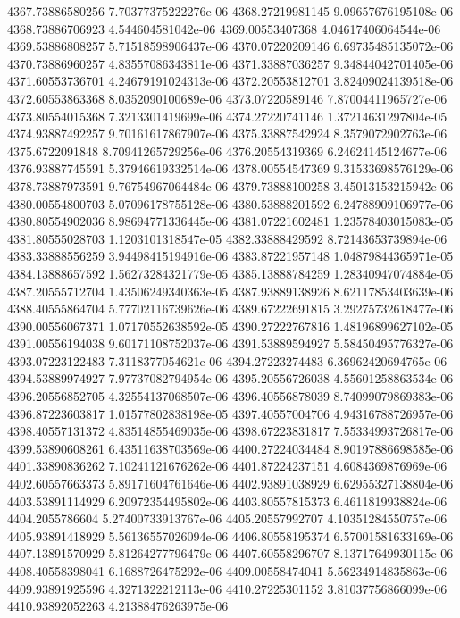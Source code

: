 {4367.73886580256 7.70377375222276e-06
4368.27219981145 9.09657676195108e-06
4368.73886706923 4.544604581042e-06
4369.00553407368 4.04617406064544e-06
4369.53886808257 5.71518598906437e-06
4370.07220209146 6.69735485135072e-06
4370.73886960257 4.83557086343811e-06
4371.33887036257 9.34844042701405e-06
4371.60553736701 4.24679191024313e-06
4372.20553812701 3.82409024139518e-06
4372.60553863368 8.0352090100689e-06
4373.07220589146 7.87004411965727e-06
4373.80554015368 7.3213301419699e-06
4374.27220741146 1.37214631297804e-05
4374.93887492257 9.70161617867907e-06
4375.33887542924 8.3579072902763e-06
4375.6722091848 8.70941265729256e-06
4376.20554319369 6.24624145124677e-06
4376.93887745591 5.37946619332514e-06
4378.00554547369 9.31533698576129e-06
4378.73887973591 9.76754967064484e-06
4379.73888100258 3.45013153215942e-06
4380.00554800703 5.07096178755128e-06
4380.53888201592 6.24788909106977e-06
4380.80554902036 8.98694771336445e-06
4381.07221602481 1.23578403015083e-05
4381.80555028703 1.1203101318547e-05
4382.33888429592 8.72143653739894e-06
4383.33888556259 3.94498415194916e-06
4383.87221957148 1.04879844365971e-05
4384.13888657592 1.56273284321779e-05
4385.13888784259 1.28340947074884e-05
4387.20555712704 1.43506249340363e-05
4387.93889138926 8.62117853403639e-06
4388.40555864704 5.77702116739626e-06
4389.67222691815 3.29275732618477e-06
4390.00556067371 1.07170552638592e-05
4390.27222767816 1.48196899627102e-05
4391.00556194038 9.60171108752037e-06
4391.53889594927 5.58450495776327e-06
4393.07223122483 7.3118377054621e-06
4394.27223274483 6.36962420694765e-06
4394.53889974927 7.97737082794954e-06
4395.20556726038 4.55601258863534e-06
4396.20556852705 4.32554137068507e-06
4396.40556878039 8.74099079869383e-06
4396.87223603817 1.01577802838198e-05
4397.40557004706 4.94316788726957e-06
4398.40557131372 4.83514855469035e-06
4398.67223831817 7.55334993726817e-06
4399.53890608261 6.43511638703569e-06
4400.27224034484 8.90197886698585e-06
4401.33890836262 7.10241121676262e-06
4401.87224237151 4.6084369876969e-06
4402.60557663373 5.89171604761646e-06
4402.93891038929 6.62955327138804e-06
4403.53891114929 6.20972354495802e-06
4403.80557815373 6.4611819938824e-06
4404.2055786604 5.27400733913767e-06
4405.20557992707 4.10351284550757e-06
4405.93891418929 5.56136557026094e-06
4406.80558195374 6.57001581633169e-06
4407.13891570929 5.81264277796479e-06
4407.60558296707 8.13717649930115e-06
4408.40558398041 6.1688726475292e-06
4409.00558474041 5.56234914835863e-06
4409.93891925596 4.3271322212113e-06
4410.27225301152 3.81037756866099e-06
4410.93892052263 4.21388476263975e-06
}
